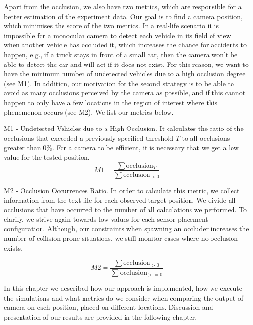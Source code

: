 Apart from the occlusion, we also have two metrics, which are responsible for a better estimation of the experiment data. Our goal is to find a camera position, which minimises the score of the two metrics. In a real-life scenario it is impossible for a monocular camera to detect each vehicle in its field of view, when another vehicle has occluded it, which increases the chance for accidents to happen, e.g., if a truck stays in front of a small car, then the camera won't be able to detect the car and will act if it does not exist. For this reason, we want to have the minimum number of undetected vehicles due to a high occlusion degree (see M1). In addition, our motivation for the second strategy is to be able to avoid as many occlusions perceived by the camera as possible, and if this cannot happen to only have a few locations in the region of interest where this phenomenon occurs (see M2). We list our metrics below.

M1 - Undetected Vehicles due to a High Occlusion. It calculates the ratio of the occlusions that exceeded a previously specified threshold $T$ to all occlusions greater than $0\%$. For a camera to be efficient, it is necessary that we get a low value for the tested position.
\begin{equation}
   M1 = \frac{\sum\textrm{occlusion}_{T}}{\sum\textrm{occlusion}_{>0}}
\end{equation}

M2 - Occlusion Occurrences Ratio. In order to calculate this metric, we collect information from the text file for each observed target position. We divide all occlusions that have occurred to the number of all calculations we performed. To clarify, we strive again towards low values for each sensor placement configuration. Although, our constraints when spawning an occluder increases the number of collision-prone situations, we still monitor cases where no occlusion exists.  

\begin{equation}
    M2 = \frac{\sum\textrm{occlusion}_{>0}}{\sum\textrm{occlusion}_{>=0}}
\end{equation}

In this chapter we described how our approach is implemented, how we execute the simulations and what metrics do we consider when comparing the output of camera on each position, placed on different locations. Discussion and presentation of our results are provided in the following chapter.